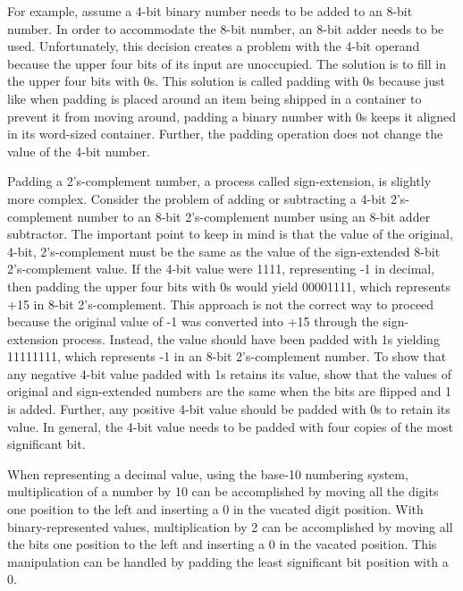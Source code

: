     For example, assume a 4-bit binary number
    needs to be added to an 8-bit number.  In order to
    accommodate the 8-bit number, an 8-bit
    adder needs to be used.  Unfortunately, this decision creates a
    problem with the
    4-bit operand because the upper four bits of its input
    are unoccupied.  The solution is to fill in the upper
    four bits with 0s.  This solution is called padding with 0s
    because just like when padding is placed around an item
    being shipped in a container to prevent it
    from moving around, padding a binary number with 0s
    keeps it aligned in its word-sized container. Further, the padding operation does not
    change the value of the 4-bit number.

    Padding a 2's-complement number, a process called sign-extension,
    is slightly more complex. Consider the problem of adding or
    subtracting a 4-bit 2's-complement number to an 8-bit 2's-complement
    number using an 8-bit adder subtractor.  The important
    point to keep in mind is that the value of the original, 4-bit,
    2's-complement must be the same as the value of the sign-extended
    8-bit 2's-complement value.  If the 4-bit value were 1111,
    representing -1 in decimal, then padding the upper four
    bits with 0s would yield 00001111, which represents +15
    in 8-bit 2's-complement.  This approach is not the correct way to proceed
    because the original value of -1 was converted into +15
    through the sign-extension process.  Instead, the value should have been padded
    with 1s yielding 11111111, which represents -1 in an
    8-bit 2's-complement number.  To show
    that any negative 4-bit value padded with 1s retains its value,
    show that the values of original and sign-extended
    numbers are the same when the bits are flipped and 1 is added.
    Further,  any positive 4-bit value should
    be padded with 0s to retain its value.  In general, the 4-bit
    value needs to be padded with four copies of the most significant
    bit.

    When representing a decimal value, using the base-10 numbering system,
    multiplication of a
    number by 10 can be accomplished by moving all the digits
    one position to the left and inserting a 0 in the vacated
    digit position.  With binary-represented values,
    multiplication by 2 can be accomplished by moving all the
    bits one position to the left and inserting a 0 in the
    vacated position.  This manipulation can be handled by padding the least
    significant bit position with a 0.

